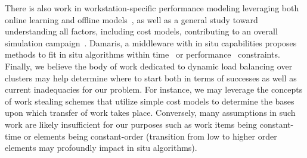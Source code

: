 There is also work in workstation-specific performance modeling leveraging both online learning and offline models~\cite{Steffens_paper}, as well as a general study toward understanding all factors, including cost models, contributing to an overall simulation campaign~\cite{KPKC16}.
Damaris, a middleware with in situ capabilities proposes methods to fit in situ algorithms within time~\cite{DSPAS13} or performance~\cite{DSGPORAB16} constraints.
Finally, we believe the body of work dedicated to dynamic load balancing over clusters may help determine where to start both in terms of successes as well as current inadequacies for our problem.  
For instance, we may leverage the concepts of work stealing schemes that utilize simple cost models to determine the bases upon which transfer of work takes place.  
Conversely, many assumptions in such work are likely insufficient for our purposes such as work items being constant-time or elements being constant-order (transition from low to higher order elements may profoundly impact in situ algorithms).


